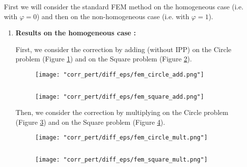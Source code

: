 First we will consider the standard FEM method on the homogeneous case (i.e. with $\varphi=0$) and then on the non-homogeneous case (i.e. with $\varphi=1$).

\begin{enumerate}[label=\textbullet]
	\item \textbf{Results on the homogeneous case :}
	
	First, we consider the correction by adding (without IPP) on the Circle problem (Figure \ref{corr_pert_fem_circle_add}) and on the Square problem (Figure \ref{corr_pert_fem_square_add}).
	
	\begin{minipage}{0.48\linewidth}
		\begin{figure}[H]
			\centering
			\texttt{[image: "corr\_pert/diff\_eps/fem\_circle\_add.png"]}
			\label{corr_pert_fem_circle_add}
		\end{figure} 
	\end{minipage} $\qquad$
	\begin{minipage}{0.48\linewidth}
		\begin{figure}[H]
			\centering
			\texttt{[image: "corr\_pert/diff\_eps/fem\_square\_add.png"]}
			\label{corr_pert_fem_square_add}
		\end{figure} 
	\end{minipage}
	
	Then, we consider the correction by multiplying on the Circle problem (Figure \ref{corr_pert_fem_circle_mult}) and on the Square problem (Figure \ref{corr_pert_fem_square_mult}).
	
	\begin{minipage}{0.48\linewidth}
		\begin{figure}[H]
			\centering
			\texttt{[image: "corr\_pert/diff\_eps/fem\_circle\_mult.png"]}
			\label{corr_pert_fem_circle_mult}
		\end{figure} 
	\end{minipage} $\qquad$
	\begin{minipage}{0.48\linewidth}
		\begin{figure}[H]
			\centering
			\texttt{[image: "corr\_pert/diff\_eps/fem\_square\_mult.png"]}
			\label{corr_pert_fem_square_mult}
		\end{figure} 
	\end{minipage}
	

\end{enumerate}
